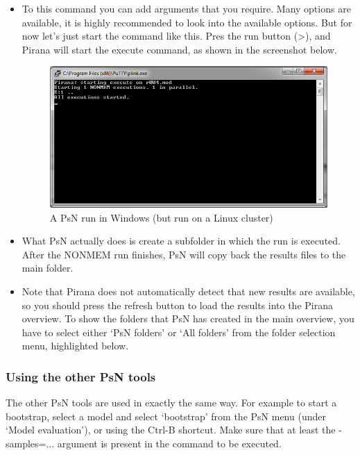 \begin{itemize}
\item To this command you can add arguments that you require. Many options
are available, it is highly recommended to look into the available
options. But for now let's just start the command like this. Pres the
run button (>), and Pirana will start the execute command, as shown in
the screenshot below.

\begin{figure}[h] \centering
  \includegraphics[scale=.4]{images/psn_run.png}
  \caption{A PsN run in Windows (but run on a Linux cluster)\label{fig:Fig3} }
\end{figure}

\item What PsN actually does is create a subfolder in which the run is
executed. After the NONMEM run finishes, PsN will copy back the
results files to the main folder.
\item Note that Pirana does not automatically detect that new results
  are available, so you should press the refresh button to load the
  results into the Pirana overview. To show the folders that PsN has
  created in the main overview, you have to select either `PsN
  folders' or `All folders' from the folder selection menu,
  highlighted below.
\end{itemize}

\subsubsection*{Using the other PsN tools}
The other PsN tools are used in exactly the same way. For example to
start a bootstrap, select a model and select `bootstrap' from the PsN
menu (under `Model evaluation'), or using the Ctrl-B shortcut. Make
sure that at least the {\ttfamily -samples=...} argument is present in
the command to be executed.

